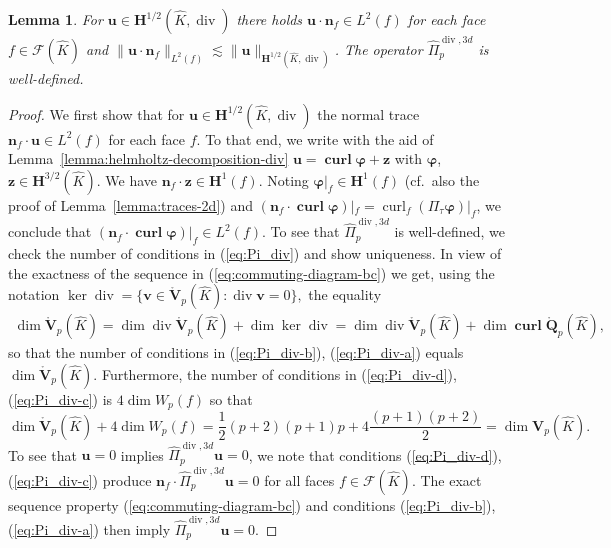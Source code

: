 \documentclass{article}
\newtheorem{lemma}[theorem]{Lemma}
\newcommand{\hatPidivcom}{\widehat\Pi^{\operatorname*{div},3d}_{p}}
\begin{document}
\begin{lemma} 
%
\label{lemma:Pi_div-well-defined}
For ${\mathbf u} \in {\mathbf H}^{1/2}(\widehat K,\operatorname{div})$ 
there holds ${\mathbf u} \cdot {\mathbf n}_f \in L^2(f)$ for each 
face $f \in {\mathcal F}(\widehat K)$  and 
$\|{\mathbf u}\cdot {\mathbf n}_f\|_{L^2(f)} \lesssim \|{\mathbf u}\|_{{\mathbf H}^{1/2}(\widehat K,\operatorname{div})}$. 
The operator $\hatPidivcom$ is well-defined. 
\end{lemma}
\begin{proof}
We first show that for ${\mathbf u} \in {\mathbf H}^{1/2}(\widehat K,\operatorname{div})$ 
the normal trace ${\mathbf n}_f \cdot {\mathbf u} \in L^2(f)$ 
for each face $f$. To that end, we write with the aid of 
Lemma~\ref{lemma:helmholtz-decomposition-div} 
${\mathbf u}=\operatorname{\mathbf{curl}} {\boldsymbol \varphi} + {\mathbf z}$ 
with ${\boldsymbol \varphi}$, ${\mathbf z} \in {\mathbf H}^{3/2}(\widehat K)$. 
We have ${\mathbf n}_f \cdot {\mathbf z} \in {\mathbf H}^1(f)$. Noting 
${\boldsymbol \varphi}|_f  \in {\mathbf H}^1(f)$ 
(cf.\ also the proof of Lemma~\ref{lemma:traces-2d})
and 
$({\mathbf n}_f \cdot \operatorname{\mathbf{curl}} {\boldsymbol \varphi})|_f  
= \operatorname{curl}_f (\Pi_\tau {\boldsymbol \varphi})|_f$, we conclude that 
$({\mathbf n}_f \cdot \operatorname{\mathbf{curl}} {\boldsymbol \varphi})|_f 
\in L^2(f)$.  To see that $\hatPidivcom$ is well-defined, we 
check the number of conditions in (\ref{eq:Pi_div}) and show uniqueness. 
In view of the
exactness of the sequence in (\ref{eq:commuting-diagram-bc}) we get, 
using the notation
$\displaystyle \operatorname{ker}\operatorname{div}=\{\mathbf{v}\in\mathring{\mathbf{V}}_p(\widehat{K}):\operatorname{div}\mathbf{v}=0\},
$
the equality
\begin{align*}
\operatorname*{dim}\mathring{\mathbf{V}}_{p}(\widehat{K})=\operatorname*{dim}%
\operatorname*{div}\mathring{\mathbf{V}}_{p}(\widehat{K})+\operatorname*{dim}%
\operatorname*{ker}\operatorname*{div}=\operatorname*{dim}\operatorname*{div}\mathring{\mathbf{V}}%
_{p}(\widehat{K})+\operatorname*{dim}\operatorname*{\mathbf{curl}}\mathring{\mathbf{Q}}_{p}(\widehat{K}),
\end{align*}
so that the number of conditions in
(\ref{eq:Pi_div-b}), (\ref{eq:Pi_div-a})  equals 
$\operatorname*{dim}\mathring{\mathbf{V}}_{p}(\widehat{K})$.
Furthermore, the number of conditions in 
(\ref{eq:Pi_div-d}), (\ref{eq:Pi_div-c}) is $4\operatorname*{dim}W_{p}(f)$
so that 
\[
\operatorname*{dim}\mathring{\mathbf{V}}_{p}(\widehat{K})+4\operatorname*{dim}%
W_{p}(f)=\frac{1}{2}(p+2)(p+1)p+4\frac{(p+1)(p+2)}{2}=\operatorname*{dim}%
\mathbf{V}_{p}(\widehat{K}).
\]
To see that ${\mathbf u}= 0$ implies $\hatPidivcom {\mathbf u} = 0$, we note
that conditions (\ref{eq:Pi_div-d}), (\ref{eq:Pi_div-c}) produce 
${\mathbf n}_f \cdot \hatPidivcom {\mathbf u} = 0$ for all faces $f \in {\mathcal F}(\widehat K)$. 
The exact sequence property (\ref{eq:commuting-diagram-bc}) and 
conditions (\ref{eq:Pi_div-b}), (\ref{eq:Pi_div-a}) then imply $\hatPidivcom {\mathbf u} = 0$. 
\end{proof}
\end{document}
